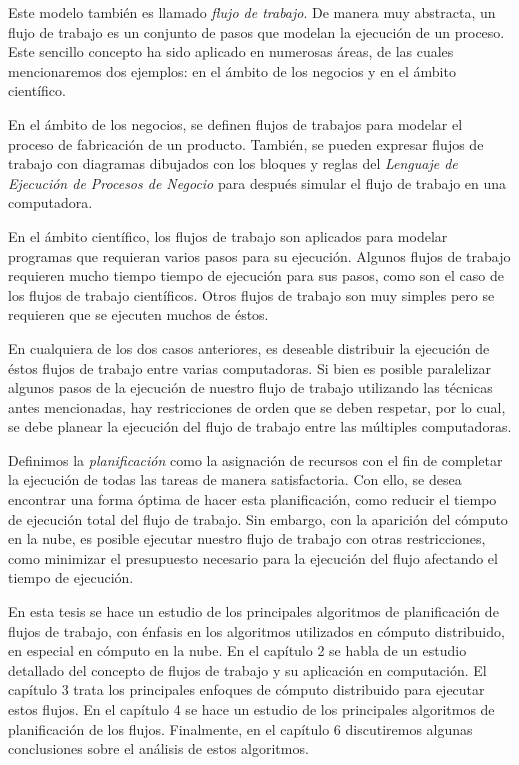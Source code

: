 Este modelo también es llamado \emph{flujo de trabajo}. De manera muy abstracta, un flujo de trabajo es un conjunto de pasos que modelan la ejecución de un proceso. Este sencillo concepto ha sido aplicado en numerosas áreas, de las cuales mencionaremos dos ejemplos: en el ámbito de los negocios y en el ámbito científico. 

En el ámbito de los negocios, se definen flujos de trabajos para modelar el proceso de fabricación de un producto. También, se pueden expresar flujos de trabajo con diagramas dibujados con los bloques y reglas del \emph{Lenguaje de Ejecución de Procesos de Negocio} para después simular el flujo de trabajo en una computadora.

En el ámbito científico, los flujos de trabajo son aplicados para modelar programas que requieran varios pasos para su ejecución. Algunos flujos de trabajo requieren mucho tiempo tiempo de ejecución para sus pasos, como son el caso de los flujos de trabajo científicos. Otros flujos de trabajo son muy simples pero se requieren que se ejecuten muchos de éstos. 

En cualquiera de los dos casos anteriores, es deseable distribuir la ejecución de éstos flujos de trabajo entre varias computadoras. Si bien es posible paralelizar algunos pasos de la ejecución de nuestro flujo de trabajo utilizando las técnicas antes mencionadas, hay restricciones de orden que se deben respetar, por lo cual, se debe planear la ejecución del flujo de trabajo entre las múltiples computadoras.

Definimos la \emph{planificación} como la asignación de recursos con el fin de completar la ejecución de todas las tareas de manera satisfactoria. Con ello, se desea encontrar una forma óptima de hacer esta planificación, como reducir el tiempo de ejecución total del flujo de trabajo. Sin embargo, con la aparición del cómputo en la nube, es posible ejecutar nuestro flujo de trabajo con otras restricciones, como minimizar el presupuesto necesario para la ejecución del flujo afectando el tiempo de ejecución.



En esta tesis se hace un estudio de los principales algoritmos de planificación de flujos de trabajo, con énfasis en los algoritmos utilizados en cómputo distribuido, en especial en cómputo en la nube. En el capítulo 2 se habla de un estudio detallado del concepto de flujos de trabajo y su aplicación en computación. El capítulo 3 trata los principales enfoques de cómputo distribuido para ejecutar estos flujos. En el capítulo 4 se hace un estudio de los principales algoritmos de planificación de los flujos. Finalmente, en el capítulo 6 discutiremos algunas conclusiones sobre el análisis de estos algoritmos.
